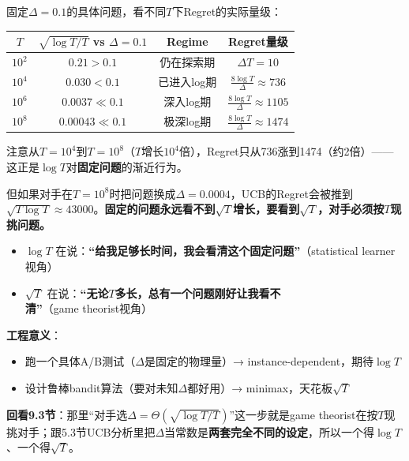 \documentclass[11pt,a4paper]{article}
\theoremstyle{definition}
\begin{document}
\begin{calculation}[同一个固定问题在两种regime之间穿越]
固定$\Delta = 0.1$的具体问题，看不同$T$下Regret的实际量级：

\begin{center}
\begin{tabular}{c|c|c|c}
\toprule
$T$ & $\sqrt{\log T / T}$ vs $\Delta = 0.1$ & Regime & Regret量级 \\
\midrule
$10^2$ & $0.21 > 0.1$ & 仍在探索期 & $\Delta T = 10$ \\
$10^4$ & $0.030 < 0.1$ & 已进入log期 & $\frac{8 \log T}{\Delta} \approx 736$ \\
$10^6$ & $0.0037 \ll 0.1$ & 深入log期 & $\frac{8 \log T}{\Delta} \approx 1105$ \\
$10^8$ & $0.00043 \ll 0.1$ & 极深log期 & $\frac{8 \log T}{\Delta} \approx 1474$ \\
\bottomrule
\end{tabular}
\end{center}

注意从$T = 10^4$到$T = 10^8$（$T$增长$10^4$倍），Regret只从736涨到1474（约2倍）——这正是$\log T$对\textbf{固定问题}的渐近行为。

但如果对手在$T = 10^8$时把问题换成$\Delta = 0.0004$，UCB的Regret会被推到$\sqrt{T\log T} \approx 43000$。\textbf{固定的问题永远看不到$\sqrt{T}$增长，要看到$\sqrt{T}$，对手必须按$T$现挑问题。}
\end{calculation}

\begin{plainwords}[一句话总结]
\begin{itemize}
    \item $\log T$ 在说：\textbf{“给我足够长时间，我会看清这个固定问题”}（statistical learner视角）
    \item $\sqrt{T}$ 在说：\textbf{“无论$T$多长，总有一个问题刚好让我看不清”}（game theorist视角）
\end{itemize}

\textbf{工程意义}：
\begin{itemize}
    \item 跑一个具体A/B测试（$\Delta$是固定的物理量）→ instance-dependent，期待$\log T$
    \item 设计鲁棒bandit算法（要对未知$\Delta$都好用）→ minimax，天花板$\sqrt{T}$
\end{itemize}

\textbf{回看9.3节}：那里“对手选$\Delta = \Theta(\sqrt{\log T/T})$”这一步就是game theorist在按$T$现挑对手；跟5.3节UCB分析里把$\Delta$当常数是\textbf{两套完全不同的设定}，所以一个得$\log T$、一个得$\sqrt{T}$。
\end{plainwords}
\end{document}
